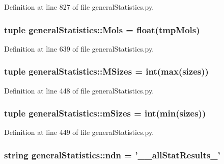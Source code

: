 \-Definition at line 827 of file general\-Statistics.\-py.

\hypertarget{namespacegeneral_statistics_afdf7a7822139d1447506bf98127d29d1}{
\subsubsection[{\-Mols}]{\setlength{\rightskip}{0pt plus 5cm}tuple {\bf general\-Statistics\-::\-Mols} = float(tmp\-Mols)}}\label{namespacegeneral_statistics_afdf7a7822139d1447506bf98127d29d1}


\-Definition at line 639 of file general\-Statistics.\-py.

\hypertarget{namespacegeneral_statistics_a72c855982b631ffb69610244f533662e}{
\subsubsection[{\-M\-Sizes}]{\setlength{\rightskip}{0pt plus 5cm}tuple {\bf general\-Statistics\-::\-M\-Sizes} = int({\bf max}({\bf sizes}))}}\label{namespacegeneral_statistics_a72c855982b631ffb69610244f533662e}


\-Definition at line 448 of file general\-Statistics.\-py.

\hypertarget{namespacegeneral_statistics_a0e29f06b06068607b9235006b7b63367}{
\subsubsection[{m\-Sizes}]{\setlength{\rightskip}{0pt plus 5cm}tuple {\bf general\-Statistics\-::m\-Sizes} = int(min({\bf sizes}))}}\label{namespacegeneral_statistics_a0e29f06b06068607b9235006b7b63367}


\-Definition at line 449 of file general\-Statistics.\-py.

\hypertarget{namespacegeneral_statistics_aab80dabdb4bf7e3d9600c16118a88f98}{
\subsubsection[{ndn}]{\setlength{\rightskip}{0pt plus 5cm}string {\bf general\-Statistics\-::ndn} = '\-\_\-\_\-all\-Stat\-Results\-\_\-'}}\label{namespacegeneral_statistics_aab80dabdb4bf7e3d9600c16118a88f98}


